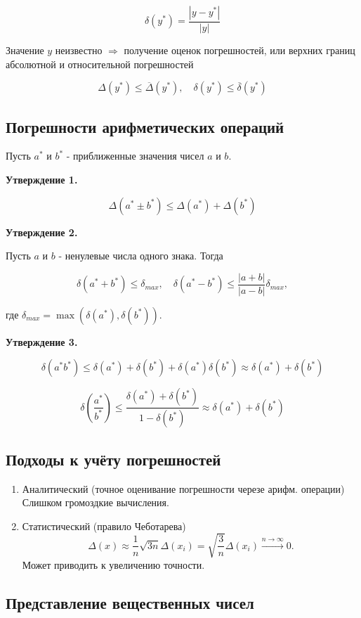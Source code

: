 $$ \delta(y^*) = \frac{|y - y^*|}{|y|} $$

Значение \( y \) неизвестно \(\Rightarrow\) получение оценок погрешностей, или верхних границ абсолютной и относительной погрешностей

$$
\Delta(y^*) \leq \overline{\Delta}(y^*), \quad \delta(y^*) \leq \overline{\delta}(y^*) $$

\subsection{Погрешности арифметических операций}

Пусть \(a^*\) и \(b^*\) - приближенные значения чисел \(a\) и \(b\).

\textbf{Утверждение 1.}

$$ \Delta(a^* \pm b^*) \leq \Delta(a^*) + \Delta(b^*) $$

\textbf{Утверждение 2.}

Пусть \( a \) и \( b \) - ненулевые числа одного знака. Тогда

$$ \delta(a^* + b^*) \leq \delta_{max}, \quad \delta(a^* - b^*) \leq \frac{|a + b|}{|a - b|} \delta_{max},$$

где \( \delta_{max} = \max(\delta(a^*), \delta(b^*)) \).

\textbf{Утверждение 3.}

$$ \delta(a^*b^*) \leq \delta(a^*) + \delta(b^*) + \delta(a^*) \delta(b^*) \approx \delta(a^*) + \delta(b^*) $$

$$ \delta\left(\frac{a^*}{b^*}\right) \leq \frac{\delta(a^*) + \delta(b^*)}{1 - \delta(b^*)} \approx \delta(a^*) + \delta(b^*) $$

\subsection{Подходы к учёту погрешностей}

\begin{enumerate}
	\item Аналитический (точное оценивание погрешности черезе арифм. операции)
		Слишком громоздкие вычисления.
	\item Статистический (правило Чеботарева)
		$$\Delta(x) \approx \frac{1}{n} \sqrt{3n} \Delta(x_i) = \sqrt{\frac{3}{n}} \Delta(x_i) \xrightarrow{n \to \infty} 0.$$
		Может приводить к увеличению точности.
\end{enumerate}

\subsection{Представление вещественных чисел}

